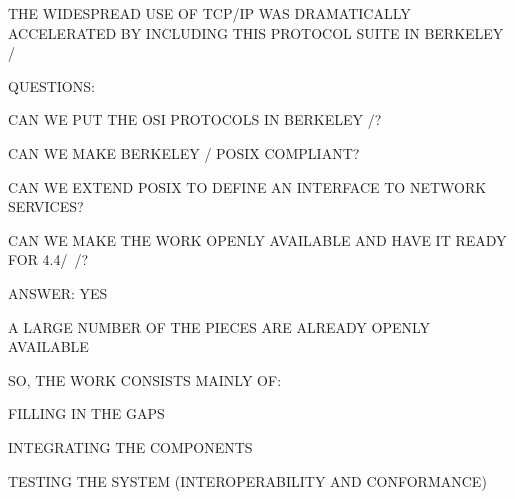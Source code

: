 \begin{bwslide}

\begin{nrtc}
\item	THE WIDESPREAD USE OF TCP/IP WAS DRAMATICALLY ACCELERATED BY INCLUDING
	THIS PROTOCOL SUITE IN BERKELEY \unix/

\item	QUESTIONS:
    \begin{nrtc}
    \item	CAN WE PUT THE OSI PROTOCOLS IN BERKELEY \unix/?

    \item	CAN WE MAKE BERKELEY \unix/ POSIX COMPLIANT?

    \item	CAN WE EXTEND POSIX TO DEFINE AN INTERFACE TO NETWORK SERVICES?

    \item	CAN WE MAKE THE WORK OPENLY AVAILABLE AND HAVE IT READY FOR
		4.4\bsd/~\unix/?
    \end{nrtc}

\item	ANSWER: YES
\end{nrtc}
\end{bwslide}


\begin{bwslide}

\begin{nrtc}
\item	A LARGE NUMBER OF THE PIECES ARE ALREADY OPENLY AVAILABLE

\item	SO, THE WORK CONSISTS MAINLY OF:
    \begin{nrtc}
    \item	FILLING IN THE GAPS

    \item	INTEGRATING THE COMPONENTS

    \item	TESTING THE SYSTEM (INTEROPERABILITY AND CONFORMANCE)
    \end{nrtc}
\end{nrtc}
\end{bwslide}


